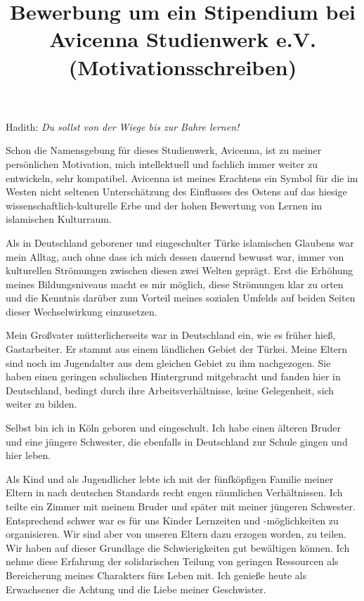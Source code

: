 \documentclass[a4paper]{article}
\title{\phantomsection%
  Bewerbung um ein Stipendium bei Avicenna Studienwerk e.V.%
  \label{bewerbung-um-ein-stipendium-bei-avicenna-studienwerk-e-v}%
  \\ %
  \large{(Motivationsschreiben)}%
  \label{motivationsschreiben}}
\author{}
\date{}
\begin{document}
\maketitle





Hadith: \emph{Du sollst von der Wiege bis zur Bahre lernen!}

Schon die Namensgebung für dieses Studienwerk, Avicenna, ist zu meiner persönlichen Motivation, mich intellektuell und fachlich immer weiter zu entwickeln, sehr kompatibel. Avicenna ist meines Erachtens ein Symbol für die im Westen nicht seltenen Unterschätzung des Einflusses des Ostens auf das hiesige wissenschaftlich-kulturelle Erbe und der hohen Bewertung von Lernen im islamischen Kulturraum.

Als in Deutschland geborener und eingeschulter Türke islamischen Glaubens war mein Alltag, auch ohne dass ich mich dessen dauernd bewusst war, immer von kulturellen Strömungen zwischen diesen zwei Welten geprägt. Erst die Erhöhung meines Bildungsniveaus macht es mir möglich, diese Strömungen klar zu orten und die Kenntnis darüber zum Vorteil meines sozialen Umfelds auf beiden Seiten dieser Wechselwirkung einzusetzen.

Mein Großvater mütterlicherseits war in Deutschland ein, wie es früher hieß, Gastarbeiter. Er stammt aus einem ländlichen Gebiet der Türkei. Meine Eltern sind noch im Jugendalter aus dem gleichen Gebiet zu ihm nachgezogen. Sie haben einen geringen schulischen Hintergrund mitgebracht und fanden hier in Deutschland, bedingt durch ihre Arbeitsverhältnisse, keine Gelegenheit, sich weiter zu bilden.

Selbst bin ich in Köln geboren und eingeschult. Ich habe einen älteren Bruder und eine jüngere Schwester, die ebenfalls in Deutschland zur Schule gingen und hier leben.

Als Kind und als Jugendlicher lebte ich mit der fünfköpfigen Familie meiner Eltern in nach deutschen Standards recht engen räumlichen Verhältnissen. Ich teilte ein Zimmer mit meinem Bruder und später mit meiner jüngeren Schwester. Entsprechend schwer war es für uns Kinder Lernzeiten und -möglichkeiten zu organisieren. Wir sind aber von unseren Eltern dazu erzogen worden, zu teilen. Wir haben auf dieser Grundlage die Schwierigkeiten gut bewältigen können. Ich nehme diese Erfahrung der solidarischen Teilung von geringen Ressourcen als Bereicherung meines Charakters fürs Leben mit. Ich genieße heute als Erwachsener die Achtung und die Liebe meiner Geschwister.
\end{document}

